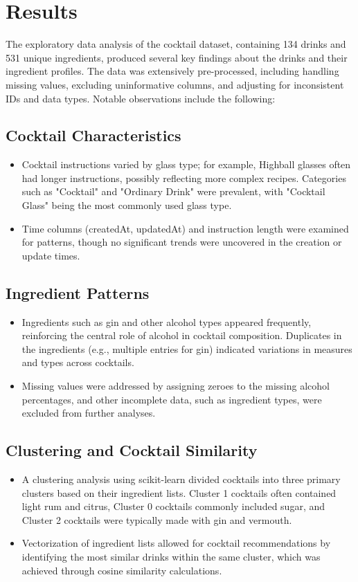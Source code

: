 \documentclass[a4paper]{article}
\begin{document}
\section{Results}
The exploratory data analysis of the cocktail dataset, containing 134 drinks and 531 unique ingredients, produced several key findings about the drinks and their ingredient profiles. The data was extensively pre-processed, including handling missing values, excluding uninformative columns, and adjusting for inconsistent IDs and data types. Notable observations include the following:

\subsection{Cocktail Characteristics}
\begin{itemize}
    \item Cocktail instructions varied by glass type; for example, Highball glasses often had longer instructions, possibly reflecting more complex recipes. Categories such as "Cocktail" and "Ordinary Drink" were prevalent, with "Cocktail Glass" being the most commonly used glass type.
    \item Time columns (createdAt, updatedAt) and instruction length were examined for patterns, though no significant trends were uncovered in the creation or update times.
\end{itemize}

\subsection{Ingredient Patterns}
\begin{itemize}
    \item Ingredients such as gin and other alcohol types appeared frequently, reinforcing the central role of alcohol in cocktail composition. Duplicates in the ingredients (e.g., multiple entries for gin) indicated variations in measures and types across cocktails.
    \item Missing values were addressed by assigning zeroes to the missing alcohol percentages, and other incomplete data, such as ingredient types, were excluded from further analyses.
\end{itemize}

\subsection{Clustering and Cocktail Similarity}
\begin{itemize}
    \item A clustering analysis using scikit-learn divided cocktails into three primary clusters based on their ingredient lists. Cluster 1 cocktails often contained light rum and citrus, Cluster 0 cocktails commonly included sugar, and Cluster 2 cocktails were typically made with gin and vermouth.
    \item Vectorization of ingredient lists allowed for cocktail recommendations by identifying the most similar drinks within the same cluster, which was achieved through cosine similarity calculations.
\end{itemize}
\end{document}
